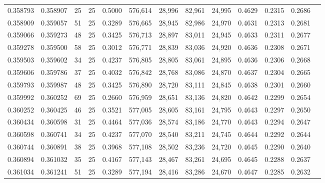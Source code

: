 \begin{tabular}{rrrrrrrrrrrrr}
0.358793 & 0.358907 &    25 &  25 &                                     0.5000 & 576,614 &  28,996 &  82,961 &  24,995 & 0.4629 & 0.2315 & 0.2686 \\
0.358909 & 0.359057 &    51 &  25 &                                     0.3289 & 576,665 &  28,945 &  82,986 &  24,970 & 0.4631 & 0.2313 & 0.2681 \\
0.359066 & 0.359273 &    48 &  25 &                                     0.3425 & 576,713 &  28,897 &  83,011 &  24,945 & 0.4633 & 0.2311 & 0.2677 \\
0.359278 & 0.359500 &    58 &  25 &                                     0.3012 & 576,771 &  28,839 &  83,036 &  24,920 & 0.4636 & 0.2308 & 0.2671 \\
0.359503 & 0.359602 &    34 &  25 &                                     0.4237 & 576,805 &  28,805 &  83,061 &  24,895 & 0.4636 & 0.2306 & 0.2668 \\
0.359606 & 0.359786 &    37 &  25 &                                     0.4032 & 576,842 &  28,768 &  83,086 &  24,870 & 0.4637 & 0.2304 & 0.2665 \\
0.359793 & 0.359987 &    48 &  25 &                                     0.3425 & 576,890 &  28,720 &  83,111 &  24,845 & 0.4638 & 0.2301 & 0.2660 \\
0.359992 & 0.360252 &    69 &  25 &                                     0.2660 & 576,959 &  28,651 &  83,136 &  24,820 & 0.4642 & 0.2299 & 0.2654 \\
0.360252 & 0.360425 &    46 &  25 &                                     0.3521 & 577,005 &  28,605 &  83,161 &  24,795 & 0.4643 & 0.2297 & 0.2650 \\
0.360434 & 0.360598 &    31 &  25 &                                     0.4464 & 577,036 &  28,574 &  83,186 &  24,770 & 0.4643 & 0.2294 & 0.2647 \\
0.360598 & 0.360741 &    34 &  25 &                                     0.4237 & 577,070 &  28,540 &  83,211 &  24,745 & 0.4644 & 0.2292 & 0.2644 \\
0.360744 & 0.360891 &    38 &  25 &                                     0.3968 & 577,108 &  28,502 &  83,236 &  24,720 & 0.4645 & 0.2290 & 0.2640 \\
0.360894 & 0.361032 &    35 &  25 &                                     0.4167 & 577,143 &  28,467 &  83,261 &  24,695 & 0.4645 & 0.2288 & 0.2637 \\
0.361034 & 0.361241 &    51 &  25 &                                     0.3289 & 577,194 &  28,416 &  83,286 &  24,670 & 0.4647 & 0.2285 & 0.2632 \\

\end{tabular}

